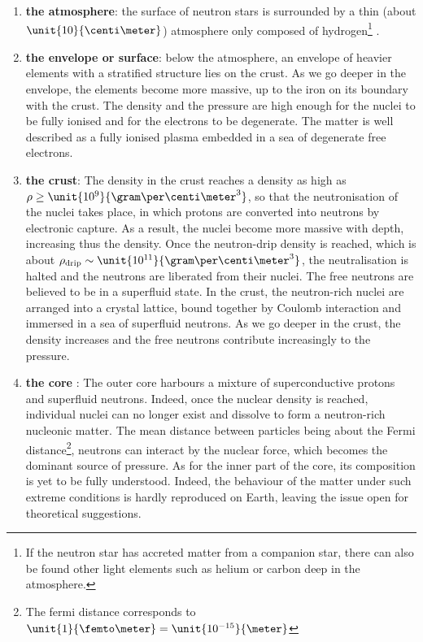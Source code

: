 \documentclass[a4paper, twoside, 12pt]{article}
\numberwithin{equation}{section}
\begin{document}
\begin{enumerate}[label=\roman*)]
\item \textbf{the atmosphere}: the surface of neutron stars is surrounded by a thin (about $\unit{10}{\centi \meter}$)\cite{atmosphere_modeling} atmosphere only composed of hydrogen\footnote{If the neutron star has accreted matter from a companion star, there can also be found other light elements such as helium or carbon deep in the atmosphere.} . 

\item \textbf{the envelope or surface}: below the atmosphere, an envelope of heavier elements with a stratified structure lies on the crust. As we go deeper in the envelope, the elements become more massive, up to the iron on its boundary with the crust. The density and the pressure are high enough for the nuclei to be fully ionised and  for the electrons to be degenerate. The matter is well described as a fully ionised plasma embedded in a sea of degenerate free electrons. 
\item \textbf{the crust}: The density in the crust reaches a density as high as $\rho \geq \unit{10^9}{\gram \per  \centi \meter^{3}}$\cite{crust_NS}, so that the neutronisation of the nuclei takes place, in which protons are converted into neutrons by electronic capture. As a result, the nuclei become more massive with depth, increasing thus the density.  Once the neutron-drip density is reached, which is about $\rho_{\rm{drip}} \sim \unit{10^{11}}{\gram \per  \centi \meter^{3}}  $, the neutralisation is halted and the neutrons are liberated from their nuclei. The free neutrons are believed to be in a superfluid state. In the crust, the neutron-rich nuclei are arranged into a crystal lattice, bound together by  Coulomb interaction and immersed in a sea of superfluid neutrons. As we go deeper in the crust, the density increases and the free neutrons contribute increasingly to the pressure. 

\item \textbf{the core} : The outer core harbours a mixture of superconductive protons and superfluid neutrons. Indeed, once the nuclear density is reached,  individual nuclei can no longer exist and dissolve to form a neutron-rich nucleonic matter. The mean distance between particles being about the Fermi distance\footnote{The fermi distance corresponds to $\unit{1}{\femto\meter} = \unit{10^{-15}}{ \meter}$}, neutrons can interact by the nuclear force, which becomes the dominant source of pressure. As for the inner part of the core, its composition is yet to be fully understood. Indeed,  the behaviour of the matter under such extreme conditions is hardly reproduced on Earth, leaving the issue open for theoretical suggestions. 
\end{enumerate}
\end{document}
